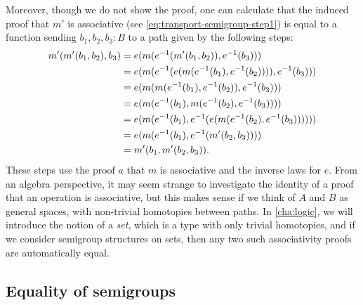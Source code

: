 Moreover, though we do not show the proof, one can calculate that the
induced proof that $m'$ is associative (see \eqref{eq:transport-semigroup-step1}) 
is equal to a function sending
$b_1,b_2,b_3 : B$ to a path given by the following steps:
\begin{equation}
  \label{eq:transport-semigroup-assoc}
  \begin{aligned}
    m'(m'(b_1,b_2),b_3)
    &= e(m(\opp{e}(m'(b_1,b_2)),\opp{e}(b_3))) \\
    &= e(m(\opp{e}(e(m(\opp{e}(b_1),\opp{e}(b_2)))),\opp{e}(b_3))) \\
    &= e(m(m(\opp{e}(b_1),\opp{e}(b_2)),\opp{e}(b_3))) \\
    &= e(m(\opp{e}(b_1),m(\opp{e}(b_2),\opp{e}(b_3)))) \\
    &= e(m(\opp{e}(b_1),\opp{e}(e(m(\opp{e}(b_2),\opp{e}(b_3)))))) \\
    &= e(m(\opp{e}(b_1),\opp{e}(m'(b_2,b_3)))) \\
    &= m'(b_1,m'(b_2,b_3)).
\end{aligned}
\end{equation}
These steps use the proof $a$ that $m$ is associative and the inverse
laws for $e$.  From an algebra perspective, it may seem strange to
investigate the identity of a proof that an operation is associative,
but this makes sense if we think of $A$ and $B$ as general spaces, with
non-trivial homotopies between paths.  In \cref{cha:logic}, we will
introduce the notion of a \emph{set}, which is a type with only trivial
homotopies, and if we consider semigroup structures on sets, then any
two such associativity proofs are automatically equal.

\subsection{Equality of semigroups}
\label{sec:equality-semigroups}

